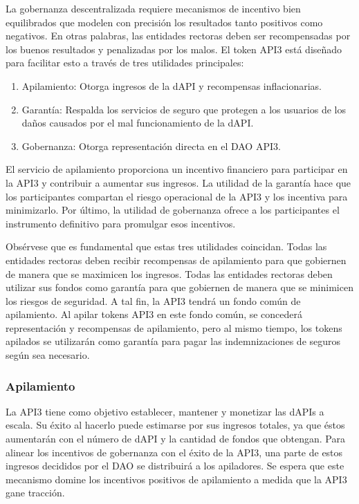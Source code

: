 \documentclass[11pt]{article}
\begin{document}
La gobernanza descentralizada requiere mecanismos de incentivo bien equilibrados que modelen con precisión los resultados tanto positivos como negativos. En otras palabras, las entidades rectoras deben ser recompensadas por los buenos resultados y penalizadas por los malos. El token API3 está diseñado para facilitar esto a través de tres utilidades principales:

\begin{enumerate}
    \item Apilamiento: Otorga ingresos de la dAPI y recompensas inflacionarias.
    \item Garantía: Respalda los servicios de seguro que protegen a los usuarios de los daños causados por el mal funcionamiento de la dAPI.
    \item Gobernanza: Otorga representación directa en el DAO API3.
\end{enumerate}

El servicio de apilamiento proporciona un incentivo financiero para participar en la API3 y contribuir a aumentar sus ingresos. La utilidad de la garantía hace que los participantes compartan el riesgo operacional de la API3 y los incentiva para minimizarlo. Por último, la utilidad de gobernanza ofrece a los participantes el instrumento definitivo para promulgar esos incentivos.

Obsérvese que es fundamental que estas tres utilidades coincidan. Todas las entidades rectoras deben recibir recompensas de apilamiento para que gobiernen de manera que se maximicen los ingresos. Todas las entidades rectoras deben utilizar sus fondos como garantía para que gobiernen de manera que se minimicen los riesgos de seguridad. A tal fin, la API3 tendrá un fondo común de apilamiento. Al apilar tokens API3 en este fondo común, se concederá representación y recompensas de apilamiento, pero al mismo tiempo, los tokens apilados se utilizarán como garantía para pagar las indemnizaciones de seguros según sea necesario.

\subsubsection{Apilamiento}
\label{sec:staking}

La API3 tiene como objetivo establecer, mantener y monetizar las dAPIs a escala. Su éxito al hacerlo puede estimarse por sus ingresos totales, ya que éstos aumentarán con el número de dAPI y la cantidad de fondos que obtengan. Para alinear los incentivos de gobernanza con el éxito de la API3, una parte de estos ingresos decididos por el DAO se distribuirá a los apiladores.  Se espera que este mecanismo domine los incentivos positivos de apilamiento a medida que la API3 gane tracción.
\end{document}
